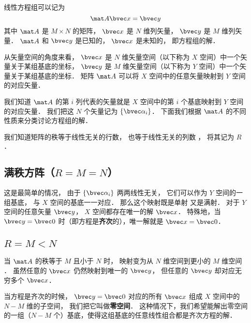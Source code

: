 

线性方程组可以记为
\begin{equation}\label{LinEq_eq1}
\mat A \bvec x = \bvec y
\end{equation}
其中 $\mat A$ 是 $M \times N$ 的矩阵， $\bvec x$ 是 $N$ 维列矢量， $\bvec y$ 是 $M$ 维列矢量． $\mat A$ 和 $\bvec y$ 是已知的， $\bvec x$ 是未知的， 即方程组的解．

从矢量空间的角度来看， $\bvec x$ 是 $N$ 维矢量空间（以下称为 $X$ 空间）中一个矢量关于某组基底的坐标， $\bvec y$ 是 $M$ 维矢量空间（以下称为 $Y$ 空间）中一个矢量关于某组基底的坐标． 矩阵 $\mat A$ 可以将 $X$ 空间中的任意矢量映射到 $Y$ 空间的对应矢量．

我们知道 $\mat A$ 的第 $i$ 列代表的矢量就是 $X$ 空间中的第 $i$ 个基底映射到 $Y$ 空间的对应矢量． 我们把这 $N$ 个矢量记为 $\{\bvec \alpha_i\}$． 下面我们根据 $\mat A$ 的不同性质来分类讨论方程组的解．

我们知道矩阵的秩等于线性无关的行数， 也等于线性无关的列数%
， 将其记为 $R$．

\subsection{满秩方阵（$R = M = N$）}
这是最简单的情况， 由于 $\{\bvec \alpha_i\}$ 两两线性无关， 它们可以作为 $Y$ 空间的一组基底， 与 $X$ 空间的基底一一对应． 那么这个映射既是单射%
又是满射．%
对于 $Y$ 空间的任意矢量 $\bvec y$， $X$ 空间都存在唯一的解 $\bvec x$． 特殊地，当 $\bvec y = \bvec 0$ 时（即方程是\textbf{齐次}的），唯一解就是 $\bvec x = \bvec 0$．

\subsection{$R = M < N$}

当 $\mat A$ 的秩等于 $M$ 且小于 $N$ 时， 映射变为从 $N$ 维空间到更小的 $M$ 维空间 ． 虽然任意的 $\bvec x$ 仍然映射到唯一的 $\bvec y$， 但任意的 $\bvec y$ 却对应无穷多个 $\bvec x$． 


当方程是齐次的时候， $\bvec y = \bvec 0$ 对应的所有 $\bvec x$ 组成 $X$ 空间中的 $N- M$ 维的子空间， 我们把它叫做\textbf{零空间}． 这种情况下，我们希望能解出零空间的一组（$N - M$ 个）基底，使得这组基底的任意线性组合都是齐次方程的解．

